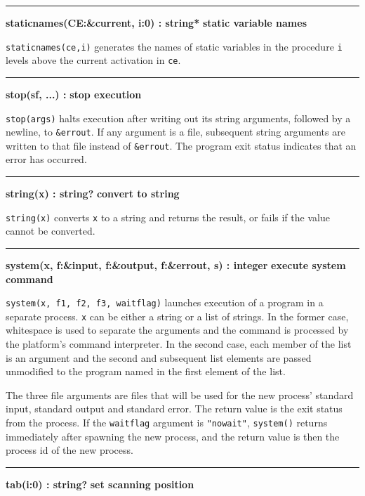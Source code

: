 \bigskip\hrule\vspace{0.1cm}
\noindent
{\bf staticnames(CE:\&current, i:0) : string* } \hfill {\bf static variable names}

\noindent
{}\texttt{staticnames(ce,i)} generates the names of static
variables in the procedure \texttt{i} levels above the current
activation in \texttt{ce}.

\bigskip\hrule\vspace{0.1cm}
\noindent
{\bf stop(s{\textbar}f, ...) : } \hfill {\bf stop execution}

\noindent
{}\texttt{stop(args)} halts execution after
writing out its string arguments, followed by a newline, to
\texttt{\&errout}. If any argument is a file, subsequent string
arguments are written to that file instead of \texttt{\&errout}. The
program exit status indicates that an error has occurred.

\bigskip\hrule\vspace{0.1cm}
\noindent
{\bf string(x) : string? } \hfill {\bf convert to string}

\noindent
{}\texttt{string(x)} converts
\texttt{x} to a string and returns the result, or fails if the value
cannot be converted.

\bigskip\hrule\vspace{0.1cm}
\noindent
{\bf system(x, f:\&input, f:\&output, f:\&errout, s) : integer } \hfill {\bf execute system command}

\noindent
{}\texttt{system(x, f1, f2, f3, waitflag)} launches
execution of a program in a separate process. \texttt{x} can be either
a string or a list of strings. In the former case, whitespace is used
to separate the arguments and the command is processed by the
platform's command interpreter. In the second case,
each member of the list is an argument and the second and subsequent
list elements are passed unmodified to the program named in the first
element of the list.

The three file arguments are files that will be used for the new
process' standard input, standard output and standard
error. The return value is the exit status from the process. If the
\texttt{waitflag} argument is
\texttt{"nowait"}, \texttt{system()}
returns immediately after spawning the new process, and the return
value is then the process id of the new process.

\bigskip\hrule\vspace{0.1cm}
\noindent
{\bf tab(i:0) : string? } \hfill {\bf set scanning position}

